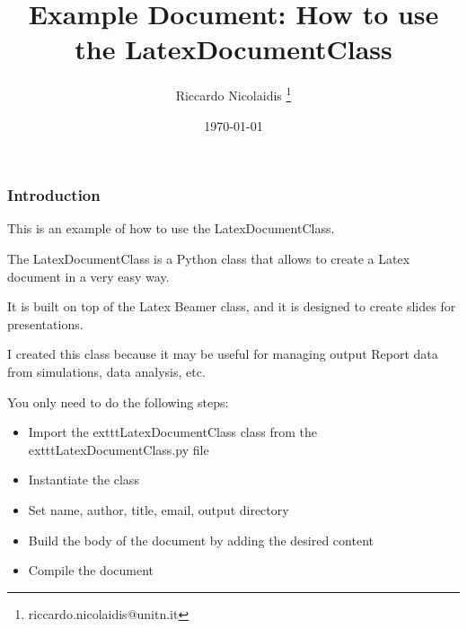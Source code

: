 \documentclass[8pt]{beamer}
\title{Example Document: How to use the LatexDocumentClass}
\author{Riccardo Nicolaidis \footnote{riccardo.nicolaidis@unitn.it}}
\date{\today}
\begin{document}
        
        \begin{frame}
            \titlepage
        \end{frame}
        
        \begin{frame}
            \frametitle{Introduction}
        
This is an example of how to use the LatexDocumentClass.

The LatexDocumentClass is a Python class that allows to create a Latex document in a very easy way.

It is built on top of the Latex Beamer class, and it is designed to create slides for presentations.

I created this class because it may be useful for managing output Report data from simulations, data analysis, etc.

You only need to do the following steps:

        \begin{itemize}
        
        \item Import the 	exttt{LatexDocumentClass} class from the 	exttt{LatexDocumentClass.py} file
        
        \item Instantiate the class
        
        \item Set name, author, title, email, output directory
        
        \item Build the body of the document by adding the desired content
        
        \item Compile the document
        
        \end{itemize}
        
        \end{frame}
        
\end{document}

